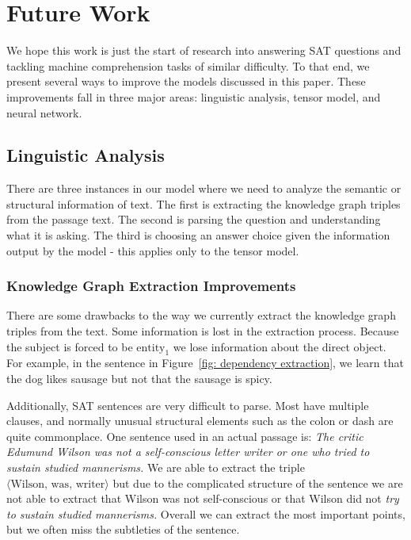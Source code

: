 \documentclass[pageno]{jpaper}
\begin{document}
\section{Future Work}
\label{Future Work}

We hope this work is just the start of research into answering SAT questions and
tackling machine comprehension tasks of similar difficulty. To that end, we
present several ways to improve the models discussed in this paper. These
improvements fall in three major areas: linguistic analysis, tensor model, and
neural network.

\subsection{Linguistic Analysis}
\label{Linguistic Analysis}

There are three instances in our model where we need to analyze the semantic or
structural information of text. The first is extracting the knowledge graph
triples from the passage text. The second is parsing the question and
understanding what it is asking. The third is choosing an answer choice given
the information output by the model - this applies only to the tensor model.

\subsubsection{Knowledge Graph Extraction Improvements}
\label{Knowledge Graph Extraction Improvements}

There are some drawbacks to the way we currently extract the knowledge graph
triples from the text. Some information is lost in the extraction process.
Because the subject is forced to be $\text{entity}_1$ we lose information about
the direct object. For example, in the sentence in Figure~\ref{fig: dependency
extraction}, we learn that the dog likes sausage but not that the sausage is
spicy.

Additionally, SAT sentences are very difficult to parse. Most have multiple
clauses, and normally unusual structural elements such as the colon or dash are
quite commonplace. One sentence used in an actual passage is: \textit{The critic
Edumund Wilson was not a self-conscious letter writer or one who tried to
sustain studied mannerisms.} We are able to extract the triple $\langle
\text{Wilson}, \,\text{was}, \,\text{writer} \rangle$ but due to the complicated
structure of the sentence we are not able to extract that Wilson was not
self-conscious or that Wilson did not \textit{try to sustain studied
mannerisms.} Overall we can extract the most important points, but we often miss
the subtleties of the sentence.
\end{document}
